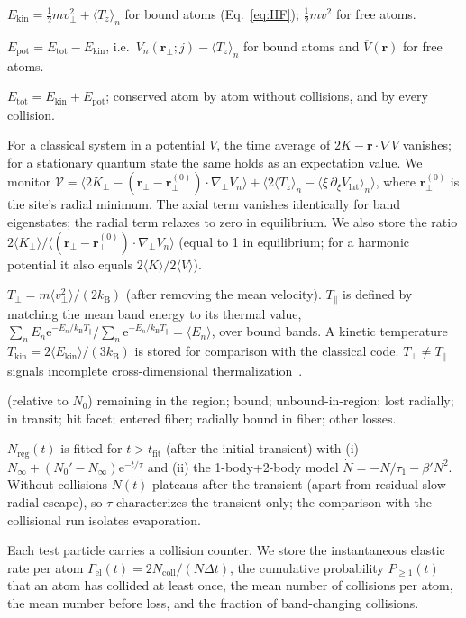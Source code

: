 \documentclass[11pt,a4paper]{article}
\newcommand{\ee}{\mathrm{e}}
\newcommand{\kB}{k_\mathrm{B}}
\newcommand{\rperp}{\bm{r}_\perp}
\begin{document}
\begin{description}[leftmargin=1.2em,style=nextline]
\item[Kinetic energy] $E_\mathrm{kin}=\frac12 mv_\perp^2+\langle T_z\rangle_n$ for bound atoms (Eq.~\eqref{eq:HF}); $\frac12 mv^2$ for free atoms.
\item[Potential energy] $E_\mathrm{pot}=E_\mathrm{tot}-E_\mathrm{kin}$, i.e.\ $V_n(\rperp;j)-\langle T_z\rangle_n$ for bound atoms and $\overline V(\bm r)$ for free atoms.
\item[Total energy] $E_\mathrm{tot}=E_\mathrm{kin}+E_\mathrm{pot}$; conserved atom by atom without collisions, and by every collision.
\item[Virial] For a classical system in a potential $V$, the time average of $2K-\bm r\cdot\nabla V$ vanishes; for a stationary quantum state the same holds as an expectation value. We monitor
$\mathcal V=\big\langle 2K_\perp-(\rperp-\rperp^{(0)})\cdot\nabla_\perp V_n\big\rangle+\big\langle 2\langle T_z\rangle_n-\langle\xi\,\partial_\xi V_\mathrm{lat}\rangle_n\big\rangle$,
where $\rperp^{(0)}$ is the site's radial minimum. The axial term vanishes identically for band eigenstates; the radial term relaxes to zero in equilibrium. We also store the ratio $2\langle K_\perp\rangle/\langle(\rperp-\rperp^{(0)})\cdot\nabla_\perp V_n\rangle$ (equal to 1 in equilibrium; for a harmonic potential it also equals $2\langle K\rangle/2\langle V\rangle$).
\item[Temperatures] $T_\perp=m\langle v_\perp^2\rangle/(2\kB)$ (after removing the mean velocity). $T_\parallel$ is defined by matching the mean band energy to its thermal value, $\sum_n E_n\ee^{-E_n/\kB T_\parallel}/\sum_n\ee^{-E_n/\kB T_\parallel}=\langle E_n\rangle$, over bound bands. A kinetic temperature $T_\mathrm{kin}=2\langle E_\mathrm{kin}\rangle/(3\kB)$ is stored for comparison with the classical code. $T_\perp\neq T_\parallel$ signals incomplete cross-dimensional thermalization~\cite{Monroe1993}.
\item[Fractions] (relative to $N_0$) remaining in the region; bound; unbound-in-region; lost radially; in transit; hit facet; entered fiber; radially bound in fiber; other losses.
\item[Decay time] $N_\mathrm{reg}(t)$ is fitted for $t>t_\mathrm{fit}$ (after the initial transient) with (i) $N_\infty+(N_0'-N_\infty)\ee^{-t/\tau}$ and (ii) the 1-body+2-body model $\dot N=-N/\tau_1-\beta' N^2$. Without collisions $N(t)$ plateaus after the transient (apart from residual slow radial escape), so $\tau$ characterizes the transient only; the comparison with the collisional run isolates evaporation.
\item[Collision probability] Each test particle carries a collision counter. We store the instantaneous elastic rate per atom $\Gamma_\mathrm{el}(t)=2N_\mathrm{coll}/(N\Delta t)$, the cumulative probability $P_{\ge1}(t)$ that an atom has collided at least once, the mean number of collisions per atom, the mean number before loss, and the fraction of band-changing collisions.
\end{description}
\end{document}
